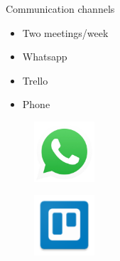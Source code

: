 \begin{frame}{Communication channels}
	\begin{itemize}
		\item Two meetings/week
		\item Whatsapp
		\item Trello
		\item Phone
	\end{itemize}

	\begin{figure}[htbp]
  		\centering
  		\includegraphics[width=0.2\textwidth]{figures/whatsapp}
	\end{figure}
	\begin{figure}[htbp]
  		\centering
  		\includegraphics[width=0.2\textwidth]{figures/trello}
	\end{figure}
\end{frame}